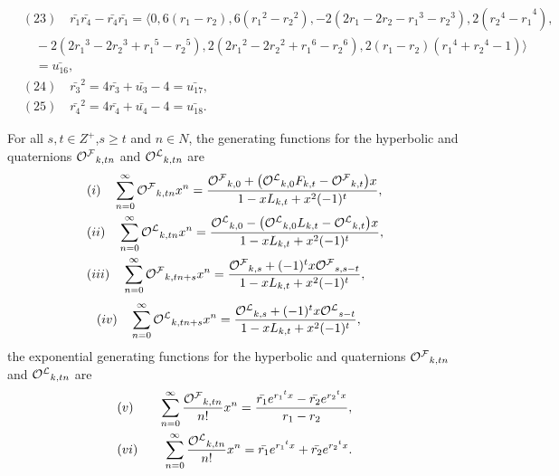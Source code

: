 \begin{lemma}
\begin{align*}
&(23)\quad \bar{r_1}\bar{r_4}-\bar{r_4}\bar{r_1}=\big\langle 0, 6(r_1-r_2), 6({r_1}^2-{r_2}^2), -2(2r_1-2r_2-{r_1}^3-{r_2}^3), 2({{r_2}^4-r_1}^4), \\&\quad-2(2{r_1}^3-2{r_2}^3+{r_1}^5-{r_2}^5), 2(2{r_1}^2-2{r_2}^2+{r_1}^6-{r_2}^6), 2(r_1-r_2)({r_1}^4+{r_2}^4-1) \big\rangle\\&\quad=\bar{u_{16}},\\
&(24)\quad {\bar{r_3}}^2=4\bar{r_3}+\bar{u_3}-4=\bar{u_{17}},\\
&(25)\quad {\bar{r_4}}^2=4\bar{r_4}+\bar{u_4}-4=\bar{u_{18}}.
\end{align*}
\end{lemma}
\begin{theorem}\label{2.5t}
For all $s, t\in Z^+$,$s\geq t$ and $n\in N$, the generating functions for the hyperbolic \kF\vspace{0mm} and \kL\vspace{0mm} quaternions ${{\mathcal{O^F}}}_{k,tn}$ and ${{\mathcal{O^L}}}_{k,tn}$ are 
\begin{align*}
&(i)\quad \sum\limits_{n=0}^{\infty}{{\mathcal{O^F}}}_{k,tn}x^n=\dfrac{{{\mathcal{O^F}}}_{k,0}+\big({{\mathcal{O^L}}}_{k,0}F_{k,t}-{{\mathcal{O^F}}}_{k,t}\big)x}{1-xL_{k,t}+x^2(-1)^t},\\
&(ii)\quad\sum\limits_{n=0}^{\infty}{{\mathcal{O^L}}}_{k,tn}x^n=\dfrac{{{\mathcal{O^L}}}_{k,0}-\big({{\mathcal{O^L}}}_{k,0}L_{k,t}-{{\mathcal{O^L}}}_{k,t}\big)x}{1-xL_{k,t}+x^2(-1)^t},\\
&(iii)\quad\sum\limits_{n=0}^{\infty}{{\mathcal{O^F}}}_{k,tn+s}x^n=\dfrac{{{\mathcal{O^F}}}_{k,s}+(-1)^tx{{\mathcal{O^F}}}_{s,s-t}}{1-xL_{k,t}+x^2(-1)^t},
\end{align*}
\begin{align*}
&(iv)\quad\sum\limits_{n=0}^{\infty}{{\mathcal{O^L}}}_{k,tn+s}x^n=\dfrac{{{\mathcal{O^L}}}_{k,s}+(-1)^tx{{\mathcal{O^L}}}_{s-t}}{1-xL_{k,t}+x^2(-1)^t},
\end{align*}
the exponential generating functions for the hyperbolic \kF\vspace{0mm} and \kL\vspace{0mm} quaternions ${{\mathcal{O^F}}}_{k,tn}$ and ${{\mathcal{O^L}}}_{k,tn}$ are
\begin{align*}
&(v)\qquad \sum\limits_{n=0}^{\infty}\dfrac{{{\mathcal{O^F}}}_{k,tn}}{{n!}}x^n=\dfrac{\bar{r_1}e^{{r_1}^tx}-\bar{r_2}e^{{r_2}^tx}}{r_1-r_2},\\
&(vi)\qquad \sum\limits_{n=0}^{\infty}\dfrac{{{\mathcal{O^L}}}_{k,tn}}{{n!}}x^n={\bar{r_1}e^{{r_1}^tx}+\bar{r_2}e^{{r_2}^tx}}.
\end{align*}
\end{theorem}
